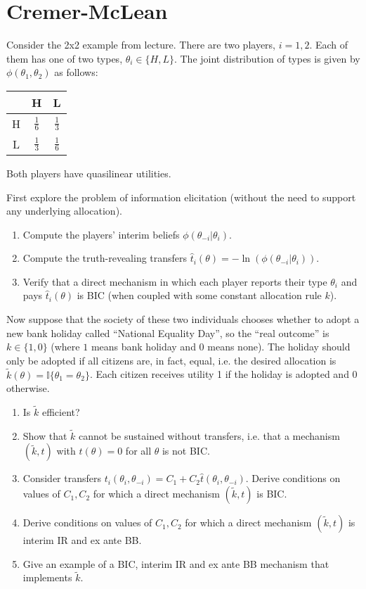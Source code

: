 \documentclass[a4paper]{article}
\begin{document}
\section{Cremer-McLean}
	
	Consider the 2x2 example from lecture. There are two players, $i=1,2$. Each of them has one of two types, $\theta_i \in \{H,L\}$. The joint distribution of types is given by $\phi(\theta_1,\theta_2)$ as follows:
	\begin{center}
		\begin{tabular}{c | c | c |}
			& H 				& L					\\ \hline
			H	& $\frac{1}{6}$ 	& $\frac{1}{3}$ 	\\ \hline
			L	& $\frac{1}{3}$ 	& $\frac{1}{6}$		\\ \hline
		\end{tabular}
	\end{center}
	Both players have quasilinear utilities.
	
	First explore the problem of information elicitation (without the need to support any underlying allocation). 
	\begin{enumerate}
		\item Compute the players' interim beliefs $\phi(\theta_{-i} | \theta_i)$.
		\item Compute the truth-revealing transfers $\hat{t}_i(\theta) = -\ln(\phi(\theta_{-i} | \theta_i))$.
		\item Verify that a direct mechanism in which each player reports their type $\theta_i$ and pays $\hat{t}_i(\theta)$ is BIC (when coupled with some constant allocation rule $k$).
	\end{enumerate}
	
	Now suppose that the society of these two individuals chooses whether to adopt a new bank holiday called ``National Equality Day'', so the ``real outcome'' is $k \in \{1,0\}$ (where $1$ means bank holiday and $0$ means none). The holiday should only be adopted if all citizens are, in fact, equal, i.e. the desired allocation is $\tilde{k}(\theta) = \mathbb{I} \{\theta_1 = \theta_2\}$. Each citizen receives utility 1 if the holiday is adopted and 0 otherwise.
	\begin{enumerate}[resume]
		\item Is $\tilde{k}$ efficient?
		\item Show that $\tilde{k}$ cannot be sustained without transfers, i.e. that a mechanism $(\tilde{k},t)$ with $t(\theta)=0$ for all $\theta$ is not BIC.
		\item Consider transfers $t_i(\theta_i,\theta_{-i}) = C_1 + C_2 \hat{t} (\theta_i,\theta_{-i})$. Derive conditions on values of $C_1,C_2$ for which a direct mechanism $(\tilde{k},t)$ is BIC.
		\item Derive conditions on values of $C_1,C_2$ for which a direct mechanism $(\tilde{k},t)$ is interim IR and ex ante BB.
		\item Give an example of a BIC, interim IR and ex ante BB mechanism that implements $\tilde{k}$.
	\end{enumerate}
\end{document}
